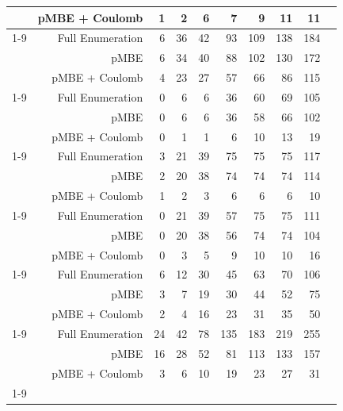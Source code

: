 \begin{longtable}{lrrrrrrrrr}
 & pMBE + Coulomb & 1 & 2 & 6 & 7 & 9 & 11 & 11 \\
\cline{1-9}
\multirow[c]{3}{*}{Pyrazole} & Full Enumeration & 6 & 36 & 42 & 93 & 109 & 138 & 184 \\
 & pMBE & 6 & 34 & 40 & 88 & 102 & 130 & 172 \\
 & pMBE + Coulomb & 4 & 23 & 27 & 57 & 66 & 86 & 115 \\
\cline{1-9}
\multirow[c]{3}{*}{Succinic Acid} & Full Enumeration & 0 & 6 & 6 & 36 & 60 & 69 & 105 \\
 & pMBE & 0 & 6 & 6 & 36 & 58 & 66 & 102 \\
 & pMBE + Coulomb & 0 & 1 & 1 & 6 & 10 & 13 & 19 \\
\cline{1-9}
\multirow[c]{3}{*}{Triazine} & Full Enumeration & 3 & 21 & 39 & 75 & 75 & 75 & 117 \\
 & pMBE & 2 & 20 & 38 & 74 & 74 & 74 & 114 \\
 & pMBE + Coulomb & 1 & 2 & 3 & 6 & 6 & 6 & 10 \\
\cline{1-9}
\multirow[c]{3}{*}{Trioxane} & Full Enumeration & 0 & 21 & 39 & 57 & 75 & 75 & 111 \\
 & pMBE & 0 & 20 & 38 & 56 & 74 & 74 & 104 \\
 & pMBE + Coulomb & 0 & 3 & 5 & 9 & 10 & 10 & 16 \\
\cline{1-9}
\multirow[c]{3}{*}{Uracil} & Full Enumeration & 6 & 12 & 30 & 45 & 63 & 70 & 106 \\
 & pMBE & 3 & 7 & 19 & 30 & 44 & 52 & 75 \\
 & pMBE + Coulomb & 2 & 4 & 16 & 23 & 31 & 35 & 50 \\
\cline{1-9}
\multirow[c]{3}{*}{Urea} & Full Enumeration & 24 & 42 & 78 & 135 & 183 & 219 & 255 \\
 & pMBE & 16 & 28 & 52 & 81 & 113 & 133 & 157 \\
 & pMBE + Coulomb & 3 & 6 & 10 & 19 & 23 & 27 & 31 \\
\cline{1-9}
\end{longtable}
